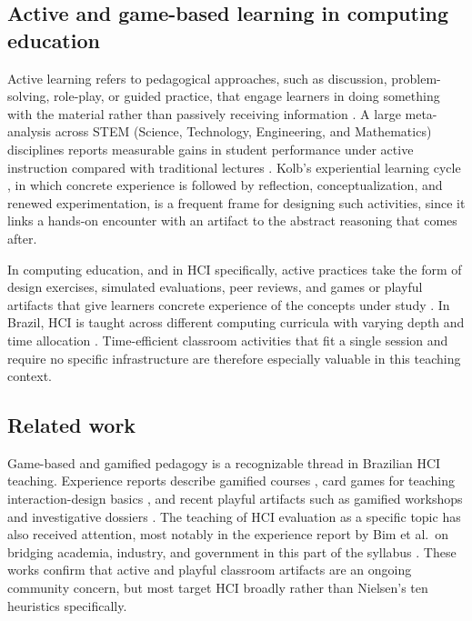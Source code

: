 \subsection{Active and game-based learning in computing education}

Active learning refers to pedagogical approaches, such as discussion, problem-solving, role-play, or guided practice, that engage learners in doing something with the material rather than passively receiving information \cite{bonwell1991active}. A large meta-analysis across STEM (Science, Technology, Engineering, and Mathematics) disciplines reports measurable gains in student performance under active instruction compared with traditional lectures \cite{freeman2014active}. Kolb's experiential learning cycle \cite{kolb1984experiential}, in which concrete experience is followed by reflection, conceptualization, and renewed experimentation, is a frequent frame for designing such activities, since it links a hands-on encounter with an artifact to the abstract reasoning that comes after.

In computing education, and in HCI specifically, active practices take the form of design exercises, simulated evaluations, peer reviews, and games or playful artifacts that give learners concrete experience of the concepts under study \cite{silveira2024praticas}. In Brazil, HCI is taught across different computing curricula with varying depth and time allocation \cite{boscarioli2013hci,boscarioli2014charting}. Time-efficient classroom activities that fit a single session and require no specific infrastructure are therefore especially valuable in this teaching context.

\subsection{Related work}
\label{sec:related}

Game-based and gamified pedagogy is a recognizable thread in Brazilian HCI teaching. Experience reports describe gamified courses \cite{miranda2019gamificacao}, card games for teaching interaction-design basics \cite{darin2019goople}, and recent playful artifacts such as gamified workshops and investigative dossiers \cite{santos2025ihcweek,rodrigues2025dossies}. The teaching of HCI evaluation as a specific topic has also received attention, most notably in the experience report by Bim et al.\ on bridging academia, industry, and government in this part of the syllabus \cite{bim2019pontes}. These works confirm that active and playful classroom artifacts are an ongoing community concern, but most target HCI broadly rather than Nielsen's ten heuristics specifically.


